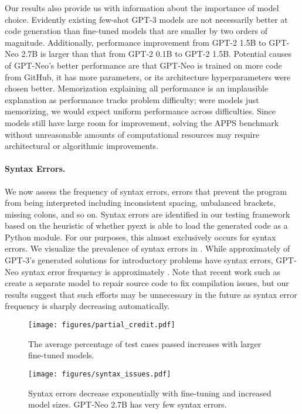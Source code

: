 \documentclass{article}
\begin{document}
Our results also provide us with information about the importance of model choice. Evidently existing few-shot GPT-3 models are not necessarily better at code generation than fine-tuned models that are smaller by two orders of magnitude. Additionally, performance improvement from GPT-2 1.5B to GPT-Neo 2.7B is larger than that from GPT-2 0.1B to GPT-2 1.5B. Potential causes of GPT-Neo's better performance are that GPT-Neo is trained on more code from GitHub, it has more parameters, or its architecture hyperparameters were chosen better. Memorization explaining all performance is an implausible explanation as performance tracks problem difficulty; were models just memorizing, we would expect uniform performance across difficulties. Since models still have large room for improvement, solving the APPS benchmark without unreasonable amounts of computational resources may require architectural or algorithmic improvements.

\paragraph{Syntax Errors.} We now assess the frequency of syntax errors, errors that prevent the program from being interpreted including inconsistent spacing, unbalanced brackets, missing colons, and so on. Syntax errors are identified in our testing framework based on the heuristic of whether pyext is able to load the generated code as a Python module. For our purposes, this almost exclusively occurs for syntax errors. We visualize the prevalence of syntax errors in . While approximately  of GPT-3's generated solutions for introductory problems have syntax errors, GPT-Neo syntax error frequency is approximately . Note that recent work such as \cite{Yasunaga2020GraphbasedSP} create a separate model to repair source code to fix compilation issues, but our results suggest that such efforts may be unnecessary in the future as syntax error frequency is sharply decreasing automatically.


\begin{figure}[t]
\begin{minipage}{.49\textwidth}
\centering
\texttt{[image: figures/partial\_credit.pdf]}
\caption{The average percentage of test cases passed increases with larger fine-tuned models.}\label{fig:partial}
\end{minipage}\hfill \begin{minipage}{.49\textwidth}
\centering
\texttt{[image: figures/syntax\_issues.pdf]}
\caption{Syntax errors decrease exponentially with fine-tuning and increased model sizes. GPT-Neo 2.7B has very few syntax errors.}\label{fig:syntax}
\end{minipage}
\end{figure}
\end{document}
